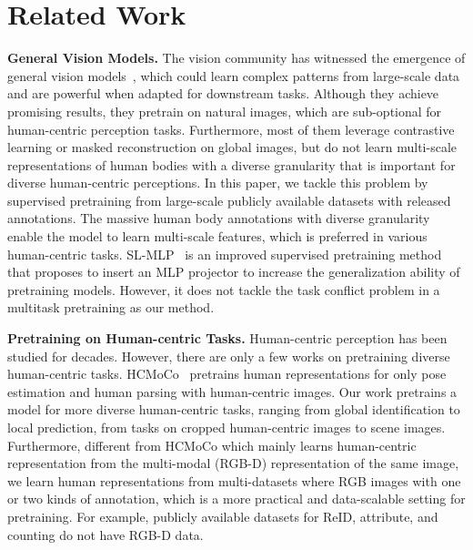 \documentclass[10pt,twocolumn,letterpaper]{article}
\begin{document}
\section{Related Work}
\noindent \textbf{General Vision Models.}
The vision community has witnessed the emergence of general vision models~\cite{yuan2021florence, shao2021intern,wang2022image,zhu2022uni}, which could learn complex patterns from large-scale data and are powerful when adapted for downstream tasks. Although they achieve promising results, they pretrain on natural images, which are sub-optional for human-centric perception tasks. Furthermore, most of them leverage contrastive learning or masked reconstruction on global images, but do not learn multi-scale representations of human bodies with a diverse granularity that is important for diverse human-centric perceptions. In this paper, we tackle this problem by supervised pretraining from large-scale publicly available datasets with released annotations. The massive human body annotations with diverse granularity enable the model to learn multi-scale features, which is preferred in various human-centric tasks. SL-MLP~\cite{wang2022revisiting} is an improved supervised pretraining method that proposes to insert an MLP projector to increase the generalization ability of pretraining models. However, it does not tackle the task conflict problem in a multitask pretraining as our method.









\noindent \textbf{Pretraining on Human-centric Tasks.}
Human-centric perception has been studied for decades. However, there are only a few works on pretraining diverse human-centric tasks. HCMoCo~\cite{hong2022versatile} pretrains human representations for only pose estimation and human parsing with human-centric images. Our work pretrains a model for more diverse human-centric tasks, ranging from global identification to local prediction, from tasks on cropped human-centric images to scene images. Furthermore, different from HCMoCo which mainly learns human-centric representation from the multi-modal (RGB-D) representation of the same image, we learn human representations from multi-datasets where RGB images with one or two kinds of annotation, which is a more practical and data-scalable setting for pretraining. For example, publicly available datasets for ReID, attribute, and counting do not have RGB-D data.
\end{document}
